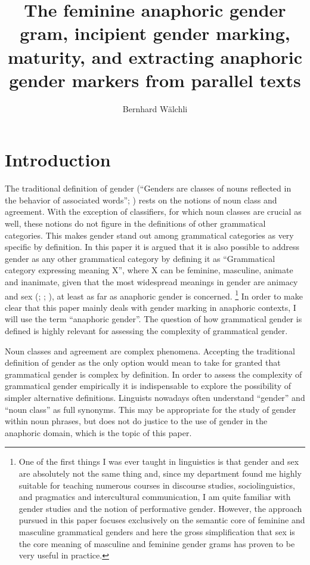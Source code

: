 \documentclass[output=collectionpaper]{langsci/langscibook}
\title{The feminine anaphoric gender gram, incipient gender marking, maturity, and extracting anaphoric gender markers from parallel texts}
\author{%
Bernhard Wälchli
\affiliation{Stockholm University}%
}%
\begin{document}
\section{Introduction}
\label{sec:BW:1}

The traditional definition of gender (“Genders are classes of nouns reflected in the behavior of associated words”; \citealt[231]{Hockett1958}) rests on the notions of noun class and agreement. With the exception of classifiers, for which noun classes are crucial as well, these notions do not figure in the definitions of other grammatical categories. This makes gender stand out among grammatical categories as very specific by definition. In this paper it is argued that it is also possible to address gender as any other grammatical category by defining it as “Grammatical category expressing meaning X”, where X can be feminine, masculine, animate and inanimate, given that the most widespread meanings in gender are animacy and sex (\citealt[101]{Dahl2000a}; \citealt[68]{Corbett1991}; \citealt{Luraghi2011}), at least as far as anaphoric gender is concerned.%
\footnote{%
One of the first things I was ever taught in linguistics is that gender and sex are absolutely not the same thing and, since my department found me highly suitable for teaching numerous courses in discourse studies, sociolinguistics, and pragmatics and intercultural communication, I am quite familiar with gender studies and the notion of performative gender. However, the approach pursued in this paper focuses exclusively on the semantic core of feminine and masculine grammatical genders and here the gross simplification that sex is the core meaning of masculine and feminine gender grams has proven to be very useful in practice.
} %
In order to make clear that this paper mainly deals with gender marking in anaphoric contexts, I will use the term “anaphoric gender”. The question of how grammatical gender is defined is highly relevant for assessing the complexity of grammatical gender.

Noun classes and agreement are complex phenomena. Accepting the traditional definition of gender as the only option would mean to take for granted that grammatical gender is complex by definition. In order to assess the complexity of grammatical gender empirically it is indispensable to explore the possibility of simpler alternative definitions. Linguists nowadays often understand “gender” and “noun class” as full synonyms. This may be appropriate for the study of gender within noun phrases, but does not do justice to the use of gender in the anaphoric domain, which is the topic of this paper.
\end{document}
